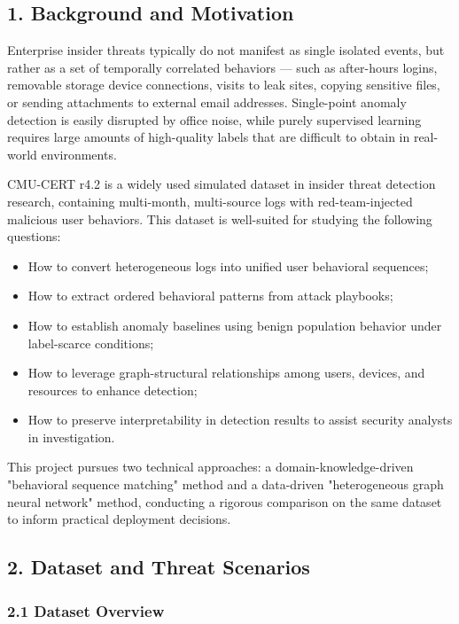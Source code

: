 \documentclass[
  a4paper,
  11pt]{article}
\providecommand{\tightlist}{%
  \setlength{\itemsep}{0pt}\setlength{\parskip}{0pt}}
\begin{document}
\subsection{1. Background and
Motivation}\label{1-background-and-motivation}

Enterprise insider threats typically do not manifest as single isolated
events, but rather as a set of temporally correlated behaviors --- such
as after-hours logins, removable storage device connections, visits to
leak sites, copying sensitive files, or sending attachments to external
email addresses. Single-point anomaly detection is easily disrupted by
office noise, while purely supervised learning requires large amounts of
high-quality labels that are difficult to obtain in real-world
environments.

CMU-CERT r4.2 is a widely used simulated dataset in insider threat
detection research, containing multi-month, multi-source logs with
red-team-injected malicious user behaviors. This dataset is well-suited
for studying the following questions:

\begin{itemize}
\tightlist
\item
  How to convert heterogeneous logs into unified user behavioral
  sequences;
\item
  How to extract ordered behavioral patterns from attack playbooks;
\item
  How to establish anomaly baselines using benign population behavior
  under label-scarce conditions;
\item
  How to leverage graph-structural relationships among users, devices,
  and resources to enhance detection;
\item
  How to preserve interpretability in detection results to assist
  security analysts in investigation.
\end{itemize}

This project pursues two technical approaches: a domain-knowledge-driven
"behavioral sequence matching" method and a data-driven "heterogeneous
graph neural network" method, conducting a rigorous comparison on the
same dataset to inform practical deployment decisions.

\subsection{2. Dataset and Threat
Scenarios}\label{2-dataset-and-threat-scenarios}

\subsubsection{2.1 Dataset Overview}\label{21-dataset-overview}
\end{document}
